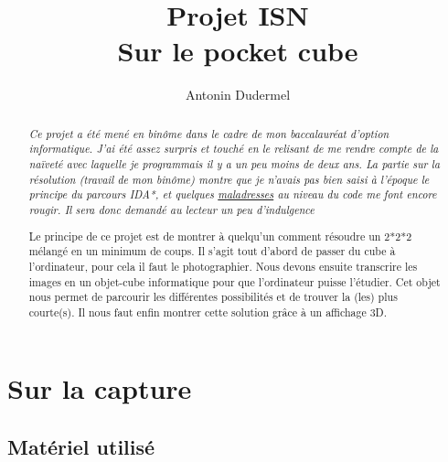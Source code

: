 \documentclass[11pt,a4paper]{article}
\title{Projet ISN\\Sur le pocket cube}
\date{}
\author{Antonin Dudermel}
\begin{document}

\maketitle

\begin{abstract}
	{\it Ce projet a été mené en binôme dans le cadre de mon baccalauréat d'option informatique. J'ai été assez surpris et touché en le relisant de me rendre compte de la naïveté avec laquelle je programmais il y a un peu moins de deux ans. La partie sur la résolution (travail de mon binôme) montre que je n'avais pas bien saisi à l'époque le principe du parcours IDA*, et quelques \href{https://xkcd.com/1833/}{maladresses} au niveau du code me font encore rougir. Il sera donc demandé au lecteur un peu d'indulgence}

Le principe de ce projet est de montrer à quelqu'un comment résoudre un 2*2*2 mélangé en un minimum de coups.
Il s'agit tout d'abord de passer du cube à l'ordinateur, pour cela il faut le photographier. 
Nous devons ensuite transcrire les images en un objet-cube informatique pour que l'ordinateur puisse l'étudier.
Cet objet nous permet de parcourir les différentes possibilités et de trouver la (les) plus courte(s).
Il nous faut enfin montrer cette solution grâce à un affichage 3D.
\end{abstract}

\section{Sur la capture}
	\subsection{Matériel utilisé}
\end{document}
